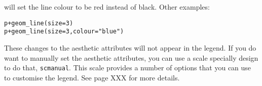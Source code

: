 \noindent will set the line colour to be red instead of black.  Other examples:

\begin{alltt}
p + geom_line(size=3)  
p + geom_line(size=3, colour="blue")  
\end{alltt}

These changes to the aesthetic attributes will not appear in the legend.  If you do want to   manually set the aesthetic attributes, you can use a scale specially design to do that, {\tt scmanual}.  This scale provides a number of options that you can use to customise the legend.  See page XXX for more details.




